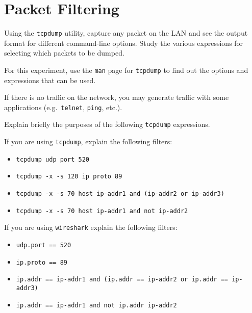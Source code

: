 \documentclass{../UTNetLab}
\begin{document}
\section{Packet Filtering}
    Using the \lstinline{tcpdump} utility, capture any packet on the LAN and see the output format
    for different command-line options. Study the various expressions for selecting
    which packets to be dumped.

    For this experiment, use the \lstinline{man} page for \lstinline{tcpdump} to find out the options and
    expressions that can be used.

    If there is no traffic on the network, you may generate traffic with some applications
    (e.g.\ \lstinline{telnet}, \lstinline{ping}, etc.).
    
    \begin{report}
    \item Explain briefly the purposes of the following \lstinline{tcpdump} expressions.
    \end{report}

    If you are using \lstinline{tcpdump}, explain the following filters:
    \begin{itemize}
        \item \lstinline{tcpdump udp port 520}
        \item \lstinline{tcpdump -x -s 120 ip proto 89}
        \item \lstinline[emph={ip-addr1, ip-addr2, ip-addr3}]{tcpdump -x -s 70 host ip-addr1 and (ip-addr2 or ip-addr3)}
        \item \lstinline[emph={ip-addr1, ip-addr2}]{tcpdump -x -s 70 host ip-addr1 and not ip-addr2}
    \end{itemize}
    
    If you are using \lstinline{wireshark} explain the following filters:
    \begin{itemize}
        \item \lstinline[language=generic]{udp.port == 520}
        \item \lstinline[language=generic]{ip.proto == 89}
        \item \lstinline[emph={ip-addr1, ip-addr2, ip-addr3},language={generic}]{ip.addr == ip-addr1 and (ip.addr == ip-addr2 or ip.addr == ip-addr3)}
        \item \lstinline[emph={ip-addr1, ip-addr2},language={generic}]{ip.addr == ip-addr1 and not ip.addr ip-addr2}
    \end{itemize}
\end{document}
